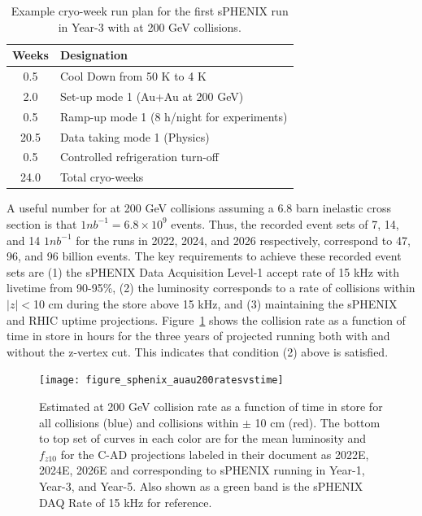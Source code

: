 \begin{table}
\centering
\begin{tabular}{ | c | l | }
\hline
Weeks & Designation \\ \hline
0.5  & Cool Down from 50 K to 4 K \\ \hline
2.0  & Set-up mode 1 (Au+Au at 200 GeV) \\ \hline
0.5  & Ramp-up mode 1 (8 h/night for experiments) \\ \hline
20.5 & Data taking mode 1 (Physics) \\ \hline
0.5  & Controlled refrigeration turn-off \\ \hline \hline \hline
24.0 & Total cryo-weeks \\
\hline
\end{tabular}
\caption{Example cryo-week run plan for the first sPHENIX run in Year-3 with \auau at 200 GeV collisions.\label{tab:cryoplan2022}}
\end{table}

A useful number for \auau at 200 GeV collisions assuming a 6.8 barn inelastic cross section is that $1 nb^{-1} = 6.8 \times 10^{9}$ events.    Thus, the recorded event sets of 7, 14, and 14 $1 nb^{-1}$ for the runs in 2022, 2024, and 2026 respectively, correspond to 47, 96, and 96 billion events.   The 
key requirements to achieve these recorded event sets are (1) the sPHENIX Data Acquisition Level-1 accept rate of 15 kHz with livetime from 90-95\%, (2) the luminosity corresponds to a rate of collisions within $|z|<$10 cm during the store above 15 kHz, and (3) maintaining the sPHENIX and RHIC uptime projections.  Figure~\ref{fig:auaulumcurves} shows the \auau collision rate as a function of time in store in hours for the three years of projected running both with and without the z-vertex cut.   This indicates that condition (2) above is satisfied.

\begin{figure}
\centering
\texttt{[image: figure\_sphenix\_auau200ratesvstime]}
\caption{Estimated \auau at 200 GeV collision rate as a function of time in store for all collisions (blue) and collisions within $\pm$ 10 cm (red).  The bottom to top set of curves in each color are for the mean luminosity and $f_{z10}$ for the C-AD projections labeled in their document as 2022E, 2024E, 2026E and corresponding to sPHENIX running in Year-1, Year-3, and Year-5.   Also shown as a green band is the sPHENIX DAQ Rate of 15 kHz for reference.
\label{fig:auaulumcurves}}
\end{figure}


